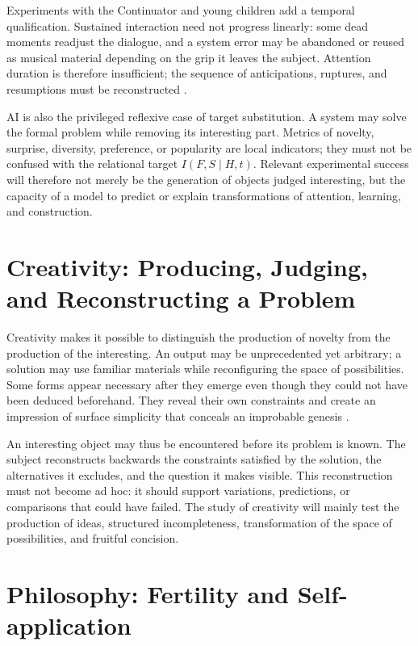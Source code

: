 \documentclass[11pt,a4paper]{article}
\begin{document}
Experiments with the Continuator and young children add a temporal qualification.
Sustained interaction need not progress linearly: some dead moments readjust the
dialogue, and a system error may be abandoned or reused as musical material depending
on the grip it leaves the subject. Attention duration is therefore insufficient; the
sequence of anticipations, ruptures, and resumptions must be reconstructed
\parencite{addessi2005experiments,addessi2006flowmachine}.

AI is also the privileged reflexive case of target substitution. A
system may solve the formal problem while removing its interesting part.
Metrics of novelty, surprise, diversity, preference, or popularity are local
indicators; they must not be confused with the relational target
\(I(F,S\mid H,t)\). Relevant experimental success will therefore not merely be
the generation of objects judged interesting, but the capacity of a model to
predict or explain transformations of attention, learning, and construction.

\section{Creativity: Producing, Judging, and Reconstructing a Problem}

Creativity makes it possible to distinguish the production of novelty from the
production of the interesting. An output may be unprecedented yet arbitrary; a
solution may use familiar materials while reconfiguring the space of
possibilities. Some forms appear necessary after they emerge even though they
could not have been deduced beforehand. They reveal their own constraints and
create an impression of surface simplicity that conceals an improbable genesis
\parencite{pachet2026impossibilite,pachet2027virtuosite}.

An interesting object may thus be encountered before its problem is known. The
subject reconstructs backwards the constraints satisfied by the solution, the
alternatives it excludes, and the question it makes visible. This reconstruction
must not become ad hoc: it should support variations, predictions, or
comparisons that could have failed. The study of creativity will mainly test the
production of ideas, structured incompleteness, transformation of the space of
possibilities, and fruitful concision.

\section{Philosophy: Fertility and Self-application}
\end{document}
